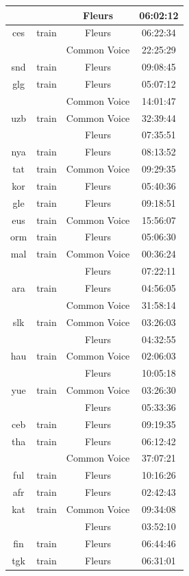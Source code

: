 \begin{longtable}{cccc}
 & & Fleurs & 06:02:12 \\ \midrule
ces & train & Fleurs & 06:22:34 \\ 
 & & Common Voice & 22:25:29 \\  \midrule
snd & train & Fleurs & 09:08:45 \\ \midrule
glg & train & Fleurs & 05:07:12 \\ 
 & & Common Voice & 14:01:47 \\ \midrule
uzb & train & Common Voice & 32:39:44 \\ 
 & & Fleurs & 07:35:51 \\  \midrule
nya & train & Fleurs & 08:13:52 \\  \midrule
tat & train & Common Voice & 09:29:35 \\ \midrule
kor & train & Fleurs & 05:40:36 \\ \midrule
gle & train & Fleurs & 09:18:51 \\ \midrule
eus & train & Common Voice & 15:56:07 \\  \midrule
orm & train & Fleurs & 05:06:30 \\  \midrule
mal & train & Common Voice & 00:36:24 \\ 
 & & Fleurs & 07:22:11 \\  \midrule
ara & train & Fleurs & 04:56:05 \\ 
 & & Common Voice & 31:58:14 \\ \midrule
slk & train & Common Voice & 03:26:03 \\ 
 & & Fleurs & 04:32:55 \\  \midrule
hau & train & Common Voice & 02:06:03 \\ 
 & & Fleurs & 10:05:18 \\ \midrule
yue & train & Common Voice & 03:26:30 \\ 
 & & Fleurs & 05:33:36 \\ \midrule
ceb & train & Fleurs & 09:19:35 \\ \midrule
tha & train & Fleurs & 06:12:42 \\ 
 & & Common Voice & 37:07:21 \\ \midrule
ful & train & Fleurs & 10:16:26 \\  \midrule
afr & train & Fleurs & 02:42:43 \\  \midrule
kat & train & Common Voice & 09:34:08 \\ 
 & & Fleurs & 03:52:10 \\  \midrule 
fin & train & Fleurs & 06:44:46 \\  \midrule
tgk & train & Fleurs & 06:31:01 \\ \midrule

\end{longtable}
